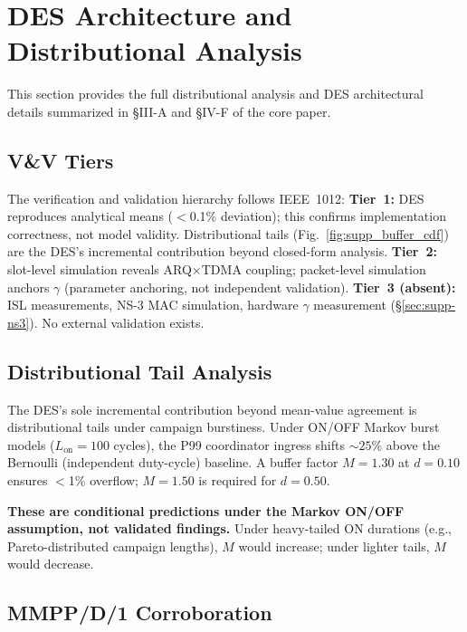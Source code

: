\documentclass[journal]{IEEEtran}
\begin{document}
\section{DES Architecture and Distributional Analysis}
\label{sec:supp-des}

This section provides the full distributional analysis and DES architectural details summarized in \S III-A and \S IV-F of the core paper.

\subsection{V\&V Tiers}

The verification and validation hierarchy follows IEEE~1012: \textbf{Tier~1:} DES reproduces analytical means ($<$0.1\% deviation); this confirms implementation correctness, not model validity. Distributional tails (Fig.~\ref{fig:supp_buffer_cdf}) are the DES's incremental contribution beyond closed-form analysis. \textbf{Tier~2:} slot-level simulation reveals ARQ$\times$TDMA coupling; packet-level simulation anchors $\gamma$ (parameter anchoring, not independent validation). \textbf{Tier~3 (absent):} ISL measurements, NS-3 MAC simulation, hardware $\gamma$ measurement (\S\ref{sec:supp-ns3}). No external validation exists.

\subsection{Distributional Tail Analysis}

The DES's sole incremental contribution beyond mean-value agreement is distributional tails under campaign burstiness. Under ON/OFF Markov burst models ($L_{\text{on}} = 100$ cycles), the P99 coordinator ingress shifts ${\sim}25\%$ above the Bernoulli (independent duty-cycle) baseline. A buffer factor $M = 1.30$ at $d = 0.10$ ensures $<$1\% overflow; $M = 1.50$ is required for $d = 0.50$.

\textbf{These are conditional predictions under the Markov ON/OFF assumption, not validated findings.} Under heavy-tailed ON durations (e.g., Pareto-distributed campaign lengths), $M$ would increase; under lighter tails, $M$ would decrease.

\subsection{MMPP/D/1 Corroboration}
\end{document}
